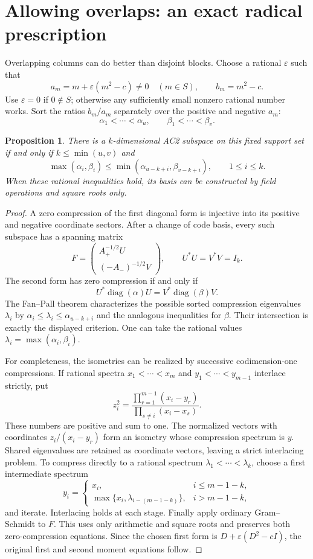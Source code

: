 \documentclass[11pt]{article}
\newtheorem{proposition}{Proposition}
\begin{document}
\section*{Allowing overlaps: an exact radical prescription}
Overlapping columns can do better than disjoint blocks. Choose a rational
$\varepsilon$ such that
\[
 a_m=m+\varepsilon(m^2-c)\ne0\quad(m\in S),\qquad b_m=m^2-c.
\]
Use $\varepsilon=0$ if $0\notin S$; otherwise any sufficiently small
nonzero rational number works. Sort the ratios $b_m/a_m$ separately over
the positive and negative $a_m$:
\[
 \alpha_1<\cdots<\alpha_u,\qquad\beta_1<\cdots<\beta_v.
\]
\begin{proposition}
There is a $k$-dimensional AC2 subspace on this fixed support set if and
only if $k\le\min(u,v)$ and
\[
 \max(\alpha_i,\beta_i)\le
 \min(\alpha_{u-k+i},\beta_{v-k+i}),\qquad1\le i\le k.
\]
When these rational inequalities hold, its basis can be constructed by
field operations and square roots only.
\end{proposition}
\begin{proof}
A zero compression of the first diagonal form is injective into its
positive and negative coordinate sectors. After a change of code basis,
every such subspace has a spanning matrix
\[
 F=\begin{pmatrix}A_+^{-1/2}U\\(-A_-)^{-1/2}V\end{pmatrix},
 \qquad U^*U=V^*V=I_k.
\]
The second form has zero compression if and only if
\[
 U^*\operatorname{diag}(\alpha)U
 =V^*\operatorname{diag}(\beta)V.
\]
The Fan--Pall theorem \cite{fanpall} characterizes the possible sorted
compression eigenvalues $\lambda_i$ by
$\alpha_i\le\lambda_i\le\alpha_{u-k+i}$ and the analogous inequalities
for $\beta$. Their intersection is exactly the displayed criterion. One
can take the rational values $\lambda_i=\max(\alpha_i,\beta_i)$.

For completeness, the isometries can be realized by successive
codimension-one compressions. If rational spectra
$x_1<\cdots<x_m$ and $y_1<\cdots<y_{m-1}$ interlace strictly, put
\[
 z_i^2=\frac{\prod_{r=1}^{m-1}(x_i-y_r)}{
                  \prod_{s\ne i}(x_i-x_s)}.
\]
These numbers are positive and sum to one. The normalized vectors with
coordinates $z_i/(x_i-y_r)$ form an isometry whose compression spectrum
is $y$. Shared eigenvalues are retained as coordinate vectors, leaving a
strict interlacing problem. To compress directly to a rational spectrum
$\lambda_1<\cdots<\lambda_k$, choose a first intermediate spectrum
\[
 y_i=\begin{cases}
 x_i,&i\le m-1-k,\\
 \max\{x_i,\lambda_{i-(m-1-k)}\},&i>m-1-k,
 \end{cases}
\]
and iterate. Interlacing holds at each stage. Finally apply ordinary
Gram--Schmidt to $F$. This uses only arithmetic and square roots and
preserves both zero-compression equations. Since the chosen first form
is $D+\varepsilon(D^2-cI)$, the original first and second moment equations
follow.
\end{proof}
\end{document}
